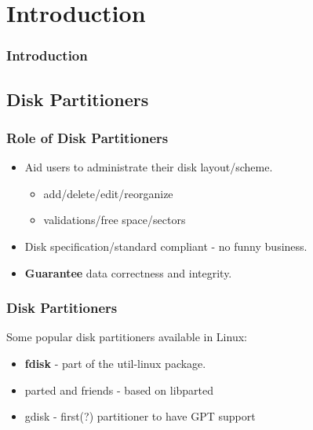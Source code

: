 
\section{Introduction}
\begin{frame}\frametitle{Introduction}
  
\end{frame}

\subsection{Disk Partitioners}
\begin{frame}\frametitle{Role of Disk Partitioners}
  \begin{itemize}
  \item Aid users to administrate their disk layout/scheme.
    \begin{itemize}
    \item add/delete/edit/reorganize
    \item validations/free space/sectors
    \end{itemize}
  \item Disk specification/standard compliant - no funny business.
  \item \textbf{Guarantee} data correctness and integrity.
  \end{itemize}
\end{frame}

\begin{frame}\frametitle{Disk Partitioners}
  Some popular disk partitioners available in Linux:
  \begin{itemize}
  \item \textbf{fdisk} - part of the util-linux package.
  \item parted and friends - based on libparted
  \item gdisk - first(?) partitioner to have GPT support
  \end{itemize}
\end{frame}
